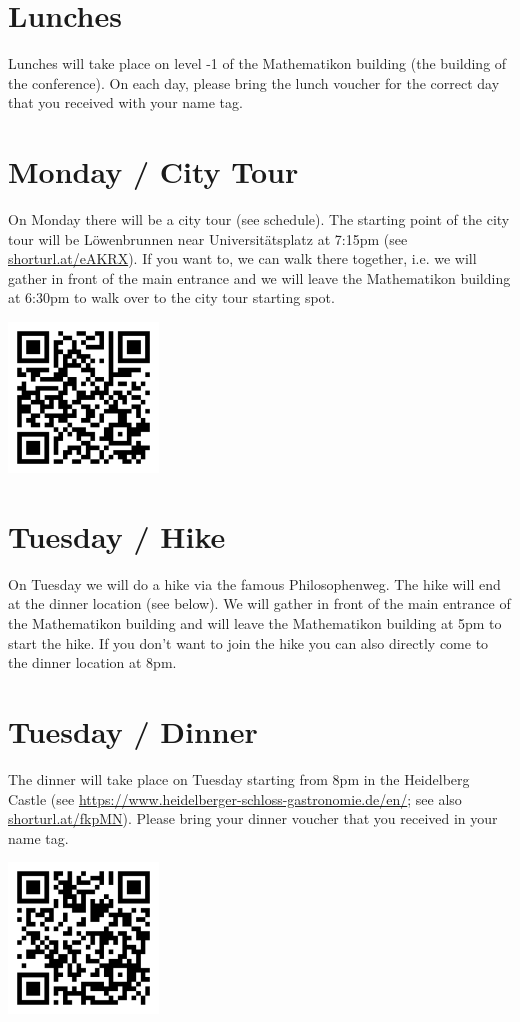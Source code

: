 \documentclass{article}
\begin{document}
\section{Lunches}
Lunches will take place on level -1 of the Mathematikon building (the building of the conference). On each day, please bring the lunch voucher for the correct day that you received with your name tag.

\section{Monday / City Tour}
On Monday there will be a city tour (see schedule). The starting point of the city tour will be Löwenbrunnen near Universitätsplatz at 7:15pm (see \url{shorturl.at/eAKRX}). If you want to, we can walk there together, i.e. we will gather in front of the main entrance and we will leave the Mathematikon building at 6:30pm to walk over to the city tour starting spot. 
\begin{center}
        \includegraphics[width=4cm]{qr-code_citytour.png}
\end{center}

\section{Tuesday / Hike}

On Tuesday we will do a hike via the famous Philosophenweg. The hike will end at the dinner location (see below). We will gather in front of the main entrance of the Mathematikon building and will leave the Mathematikon building at 5pm to start the hike. If you don't want to join the hike you can also directly come to the dinner location at 8pm.
\section{Tuesday / Dinner}
The dinner will take place on Tuesday starting from 8pm in the Heidelberg Castle (see \url{https://www.heidelberger-schloss-gastronomie.de/en/}; see also \url{shorturl.at/fkpMN}). Please bring your dinner voucher that you received in your name tag. 
\begin{center}
        \includegraphics[width=4cm]{qr-code_schloss_location.png}
\end{center}
\end{document}
